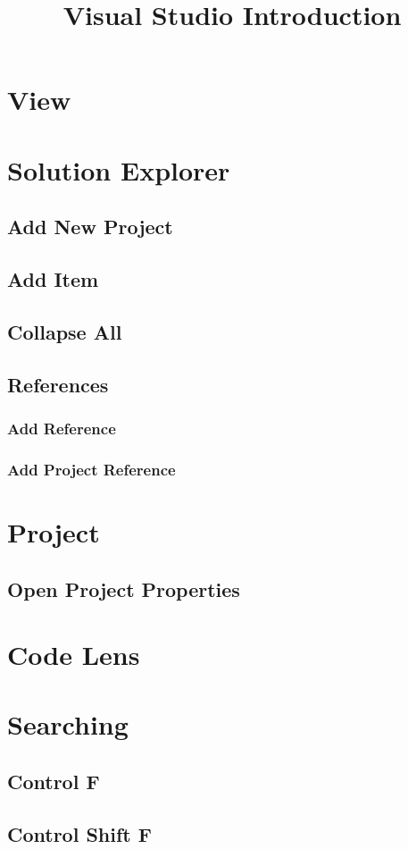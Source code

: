 \documentclass {amsart}
\title{Visual Studio Introduction}
\begin{document}
\section{View}

\section{Solution Explorer}
	\subsection{Add New Project}
	\subsection{Add Item}
	\subsection{Collapse All}
	\subsection{References}
		\subsubsection{Add Reference}
		\subsubsection{Add Project Reference}

\section{Project}
	\subsection{Open Project Properties}

\section{Code Lens}

\section{Searching}
	\subsection{Control F}
	\subsection{Control Shift F}
\end{document}
